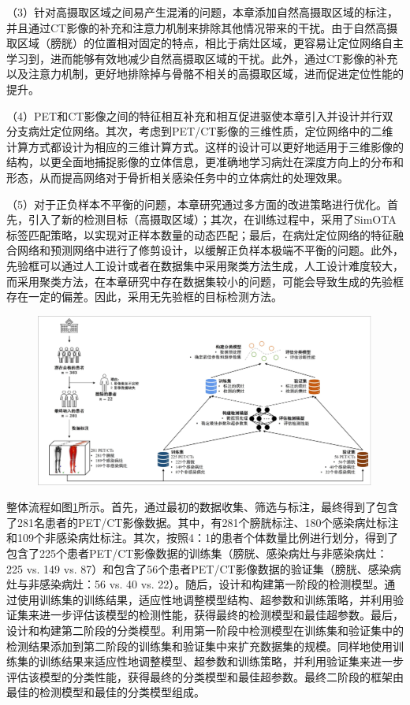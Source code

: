 （3）针对高摄取区域之间易产生混淆的问题，本章添加自然高摄取区域的标注，并且通过CT影像的补充和注意力机制来排除其他情况带来的干扰。由于自然高摄取区域（膀胱）的位置相对固定的特点，相比于病灶区域，更容易让定位网络自主学习到，进而能够有效地减少自然高摄取区域的干扰。此外，通过CT影像的补充以及注意力机制，更好地排除掉与骨骼不相关的高摄取区域，进而促进定位性能的提升。

（4）PET和CT影像之间的特征相互补充和相互促进驱使本章引入并设计并行双分支病灶定位网络。其次，考虑到PET/CT影像的三维性质，定位网络中的二维计算方式都设计为相应的三维计算方式。这样的设计可以更好地适用于三维影像的结构，以更全面地捕捉影像的立体信息，更准确地学习病灶在深度方向上的分布和形态，从而提高网络对于骨折相关感染任务中的立体病灶的处理效果。

（5）对于正负样本不平衡的问题，本章研究通过多方面的改进策略进行优化。首先，引入了新的检测目标（高摄取区域）；其次，在训练过程中，采用了SimOTA标签匹配策略，以实现对正样本数量的动态匹配；最后，在病灶定位网络的特征融合网络和预测网络中进行了修剪设计，以缓解正负样本极端不平衡的问题。此外，先验框可以通过人工设计或者在数据集中采用聚类方法生成，人工设计难度较大，而采用聚类方法，在本章研究中存在数据集较小的问题，可能会导致生成的先验框存在一定的偏差。因此，采用无先验框的目标检测方法。

\begin{figure}[htbp]
  \centering
  \includegraphics[width=\textwidth]{figures/chap04_study.jpg}
  \label{fig:chap04_study}
\end{figure}

整体流程如图\ref{fig:chap04_study}所示。首先，通过最初的数据收集、筛选与标注，最终得到了包含了281名患者的PET/CT影像数据。其中，有281个膀胱标注、180个感染病灶标注和109个非感染病灶标注。其次，按照4：1的患者个体数量比例进行划分，得到了包含了225个患者PET/CT影像数据的训练集（膀胱、感染病灶与非感染病灶：225 vs. 149 vs. 87）和包含了56个患者PET/CT影像数据的验证集（膀胱、感染病灶与非感染病灶：56 vs. 40 vs. 22）。随后，设计和构建第一阶段的检测模型。通过使用训练集的训练结果，适应性地调整模型结构、超参数和训练策略，并利用验证集来进一步评估该模型的检测性能，获得最终的检测模型和最佳超参数。最后，设计和构建第二阶段的分类模型。利用第一阶段中检测模型在训练集和验证集中的检测结果添加到第二阶段的训练集和验证集中来扩充数据集的规模。同样地使用训练集的训练结果来适应性地调整模型、超参数和训练策略，并利用验证集来进一步评估该模型的分类性能，获得最终的分类模型和最佳超参数。最终二阶段的框架由最佳的检测模型和最佳的分类模型组成。

